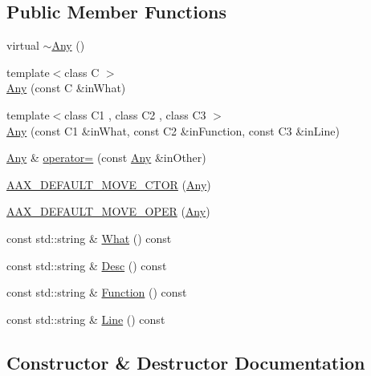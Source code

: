 \subsection*{Public Member Functions}
\begin{DoxyCompactItemize}
\item 
virtual \mbox{\hyperlink{a01593_ac8a5ec0e754e887a46d89bc715f21913}{$\sim$\+Any}} ()
\item 
{\footnotesize template$<$class C $>$ }\\\mbox{\hyperlink{a01593_a35c51844258ed1c71259e98128fa1b49}{Any}} (const C \&in\+What)
\item 
{\footnotesize template$<$class C1 , class C2 , class C3 $>$ }\\\mbox{\hyperlink{a01593_a9578bed0d27f81be2908f93f19034474}{Any}} (const C1 \&in\+What, const C2 \&in\+Function, const C3 \&in\+Line)
\item 
\mbox{\hyperlink{a01593}{Any}} \& \mbox{\hyperlink{a01593_a249c609f463a981013d5799e9e86b08e}{operator=}} (const \mbox{\hyperlink{a01593}{Any}} \&in\+Other)
\item 
\mbox{\hyperlink{a01593_a9de3a5ad28f7b36c0930dcb71c585855}{A\+A\+X\+\_\+\+D\+E\+F\+A\+U\+L\+T\+\_\+\+M\+O\+V\+E\+\_\+\+C\+T\+OR}} (\mbox{\hyperlink{a01593}{Any}})
\item 
\mbox{\hyperlink{a01593_a4a698473997da5ebf0c0092618715234}{A\+A\+X\+\_\+\+D\+E\+F\+A\+U\+L\+T\+\_\+\+M\+O\+V\+E\+\_\+\+O\+P\+ER}} (\mbox{\hyperlink{a01593}{Any}})
\item 
const std\+::string \& \mbox{\hyperlink{a01593_a3ceff81ddcd5c9694d1f3e0f01616563}{What}} () const
\item 
const std\+::string \& \mbox{\hyperlink{a01593_a7ce275788cf887eb3f668f0c5de970d0}{Desc}} () const
\item 
const std\+::string \& \mbox{\hyperlink{a01593_a0fb60f64c722aedd6fb90d8c38f66c8a}{Function}} () const
\item 
const std\+::string \& \mbox{\hyperlink{a01593_acb449c037d3ff8e221ba86a72cda93c8}{Line}} () const
\end{DoxyCompactItemize}


\subsection{Constructor \& Destructor Documentation}
\mbox{\label{a01593_ac8a5ec0e754e887a46d89bc715f21913}} 
